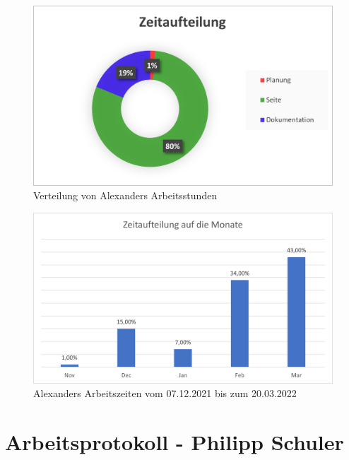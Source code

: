 \begin{figure}[H]
    \begin{center}
        \includegraphics[width=1\textwidth]{images/Zeiten/Zeitaufteilung-Bertoni.png}
        \caption{Verteilung von Alexanders Arbeitsstunden}
    \end{center}
\end{figure}

\begin{figure}[H]
    \begin{center}
        \includegraphics[width=1\textwidth]{images/Zeiten/Zeitaufteilung-auf-Monate-Bertoni.png}
        \caption{Alexanders Arbeitszeiten vom 07.12.2021 bis zum 20.03.2022}
    \end{center}
\end{figure}

\newpage
\section*{Arbeitsprotokoll - Philipp Schuler}

